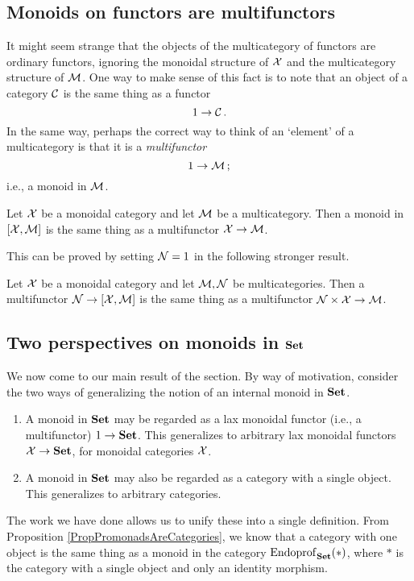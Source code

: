 \documentclass{article}
\begin{document}
\subsection{Monoids on functors are multifunctors}
It might seem strange that the objects of the multicategory of functors are ordinary functors, ignoring the monoidal structure of $\mathcal X$ and the multicategory structure of $\mathcal M$.  
One way to make sense of this fact is to note that an object of a category ${\mathcal{C}}$ is the same thing as a functor
\[
  1 \to {\mathcal{C}}\,.
  \]
In the same way, perhaps the correct way to think of an `element' of a multicategory is that it is a \emph{multifunctor}
\[
  1 \to \mathcal M\,;
  \]
i.e., a monoid in $\mathcal M$.

\begin{proposition}
  Let $\mathcal X$ be a monoidal category and let $\mathcal M$ be a multicategory.  
  Then a monoid in $[\mathcal X,\mathcal M]$ is the same thing as a multifunctor $\mathcal X \to \mathcal M$.
  \label{PropMonoidInXMIsMultifunctorXToM}
\end{proposition}

This can be proved by setting $\mathcal N=1$ in the following stronger result.

\begin{proposition}
  Let $\mathcal X$ be a monoidal category and let $\mathcal M,\mathcal N$ be multicategories.  
  \label{PropPisani}
  Then a multifunctor $\mathcal N \to [\mathcal X,\mathcal M]$ is the same thing as a multifunctor $\mathcal N\times\mathcal X \to \mathcal M$.
\end{proposition}

\subsection{Two perspectives on monoids in ${\normalfont\textbf{Set}}$}

We now come to our main result of the section.  
By way of motivation, consider the two ways of generalizing the notion of an internal monoid in ${\normalfont\textbf{Set}}$.

\begin{enumerate}
  \item A monoid in ${\normalfont\textbf{Set}}$ may be regarded as a lax monoidal functor (i.e., a multifunctor) $1 \to {\normalfont\textbf{Set}}$.  
    This generalizes to arbitrary lax monoidal functors $\mathcal X \to {\normalfont\textbf{Set}}$, for monoidal categories $\mathcal X$.
  \item A monoid in ${\normalfont\textbf{Set}}$ may also be regarded as a category with a single object.  
    This generalizes to arbitrary categories.
\end{enumerate}

The work we have done allows us to unify these into a single definition.  
From Proposition \ref{PropPromonadsAreCategories}, we know that a category with one object is the same thing as a monoid in the category $\operatorname{Endoprof}_{\normalfont\textbf{Set}}(*)$, where $*$ is the category with a single object and only an identity morphism.
\end{document}
